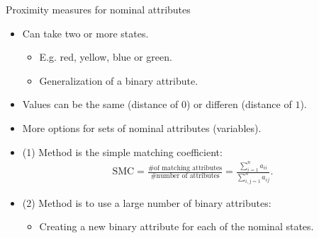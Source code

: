 \documentclass[aspectratio=169,t]{beamer}
\begin{document}
  { 
    \begin{frame}{Proximity measures for nominal attributes}
    \begin{itemize}
      \item Can take two or more states.
      \begin{itemize}
        \item E.g. red, yellow, blue or green.
        \item Generalization of a binary attribute.
      \end{itemize}
      \item Values can be the same (distance of $0$) or differen (distance of $1$).
      \item More options for sets of nominal attributes (variables).
      \item (1) Method is the simple matching coefficient:
      \begin{align}
        \text{SMC} = \frac{\# \text{of matching attributes}}{\# \text{number of attributes}} = \frac{\sum\limits_{i=1}^{n} a_{ii}}{\sum\limits_{i,j=1}^{n}a_{ij}}.
      \end{align}
      \item (2) Method is to use a large number of binary attributes:
      \begin{itemize}
        \item Creating a new binary attribute for each of the nominal states.
      \end{itemize}
    \end{itemize}
    \end{frame}
  }
\end{document}
